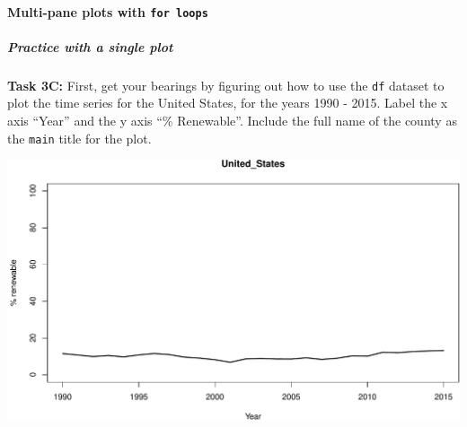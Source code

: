 \documentclass[
]{book}
\newenvironment{Shaded}{\begin{snugshade}}{\end{snugshade}}
\newcommand{\CommentTok}[1]{\textcolor[rgb]{0.56,0.35,0.01}{\textit{#1}}}
\newcommand{\DataTypeTok}[1]{\textcolor[rgb]{0.13,0.29,0.53}{#1}}
\newcommand{\DecValTok}[1]{\textcolor[rgb]{0.00,0.00,0.81}{#1}}
\newcommand{\KeywordTok}[1]{\textcolor[rgb]{0.13,0.29,0.53}{\textbf{#1}}}
\newcommand{\NormalTok}[1]{#1}
\newcommand{\StringTok}[1]{\textcolor[rgb]{0.31,0.60,0.02}{#1}}
\begin{document}
\hypertarget{multi-pane-plots-with-for-loops}{%
\paragraph{\texorpdfstring{Multi-pane plots with \texttt{for\ loops}}{Multi-pane plots with for loops}}\label{multi-pane-plots-with-for-loops}}

\hypertarget{practice-with-a-single-plot}{%
\subparagraph{Practice with a single plot}\label{practice-with-a-single-plot}}

\textbf{Task 3C:} First, get your bearings by figuring out how to use the \texttt{df} dataset to plot the time series for the United States, for the years 1990 - 2015. Label the x axis ``Year'' and the y axis ``\% Renewable''. Include the full name of the county as the \texttt{main} title for the plot.

\begin{Shaded}
\end{Shaded}

\includegraphics{figures/unnamed-chunk-324-1.pdf}
\end{document}
